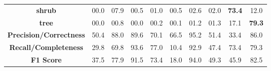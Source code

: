 \documentclass[final,3p,times,twocolumn,authoryear]{elsarticle}
\begin{document}
\begin{table*}[t]
\begin{tabular}{c|ccccccccc}
\multicolumn{1}{c|}{\textbf{shrub}}                 & 00.0          & 07.9             & 00.5              & 01.0          & 00.5                 & 02.6          & 02.0          & \textbf{73.4} & 12.0 \\
\multicolumn{1}{c|}{\textbf{tree}}                  & 00.0          & 00.8             & 00.0              & 00.2          & 00.1                 & 01.2          & 01.3          & 17.1          & \textbf{79.3} \\ \hline
\multicolumn{1}{c|}{\textbf{Precision/Correctness}} & 50.4          & 88.0             & 89.6              & 70.1          & 66.5                 & 95.2          & 51.4          & 33.4          & 86.0 \\
\multicolumn{1}{c|}{\textbf{Recall/Completeness}}   & 29.8          & 69.8             & 93.6              & 77.0          & 10.4                 & 92.9          & 47.4          & 73.4          & 79.3 \\
\multicolumn{1}{c|}{\textbf{F1 Score}}              & 37.5          & 77.9             & 91.5              & 73.4          & 18.0                 & 94.0          & 49.3          & 45.9          & 82.5 \\ \hline
\end{tabular}
\end{table*}
\end{document}
